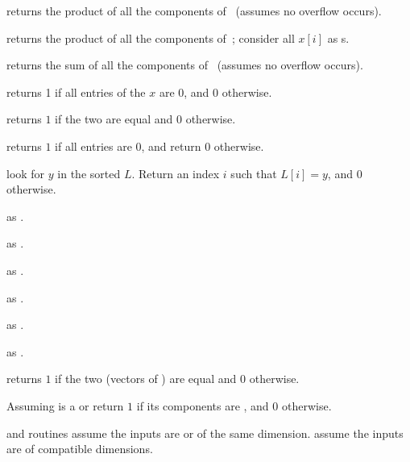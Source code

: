 
 returns the product of all the components
of~ (assumes no overflow occurs).

 returns the product of all the components
of~; consider all $x[i]$ as s.

 returns the sum of all the components
of~ (assumes no overflow occurs).

 returns 1 if all entries of the  $x$ are $0$,
and $0$ otherwise.

 returns $1$ if the two  are equal
and $0$ otherwise.

 returns $1$ if all entries are $0$, and return
$0$ otherwise.

 look for $y$ in the sorted
 $L$. Return an index $i$ such that $L[i] = y$, and  $0$ otherwise.

 as .

 as .

 as .

 as .

 as .

 as .

 returns $1$ if the two  (vectors
of ) are equal and $0$ otherwise.


 Assuming  is a 
or  return $1$ if its components are , and $0$ otherwise.




 and  routines assume the inputs are  or 
of the same dimension.  assume the inputs are  of
compatible dimensions.


